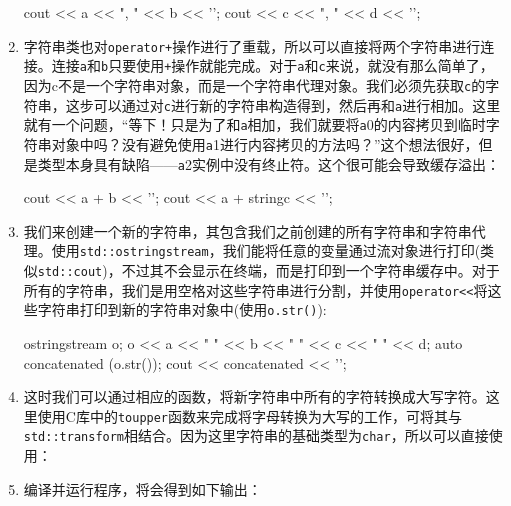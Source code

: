 \begin{enumerate}
\begin{codebox}[cpp]
    cout << a << ", " << b << '\n';
    cout << c << ", " << d << '\n'; 
\end{codebox}

\item 字符串类也对\texttt{operator+}操作进行了重载，所以可以直接将两个字符串进行连接。连接\texttt{a}和\texttt{b}只要使用\texttt{+}操作就能完成。对于\texttt{a}和\texttt{c}来说，就没有那么简单了，因为c不是一个字符串对象，而是一个字符串代理对象。我们必须先获取\texttt{c}的字符串，这步可以通过对\texttt{c}进行新的字符串构造得到，然后再和\texttt{a}进行相加。这里就有一个问题，“等下！只是为了和\texttt{a}相加，我们就要将\texttt{a}0的内容拷贝到临时字符串对象中吗？没有避免使用\texttt{a}1进行内容拷贝的方法吗？”这个想法很好，但是类型本身具有缺陷——\texttt{a}2实例中没有终止符。这个很可能会导致缓存溢出：

\begin{codebox}[cpp]
    cout << a + b << '\n';
    cout << a + string{c} << '\n'; 
\end{codebox}

\item 我们来创建一个新的字符串，其包含我们之前创建的所有字符串和字符串代理。使用\texttt{std::ostringstream}，我们能将任意的变量通过流对象进行打印(类似\texttt{std::cout})，不过其不会显示在终端，而是打印到一个字符串缓存中。对于所有的字符串，我们是用空格对这些字符串进行分割，并使用\texttt{operator<<}将这些字符串打印到新的字符串对象中(使用\texttt{o.str()}):

\begin{codebox}[cpp]
ostringstream o;
o << a << " " << b << " " << c << " " << d;
auto concatenated (o.str());
cout << concatenated << '\n';
\end{codebox}

\item 这时我们可以通过相应的函数，将新字符串中所有的字符转换成大写字符。这里使用C库中的\texttt{toupper}函数来完成将字母转换为大写的工作，可将其与\texttt{std::transform}相结合。因为这里字符串的基础类型为\texttt{char}，所以可以直接使用：

\begin{codebox}[cpp]
    transform(begin(concatenated), end(concatenated),
             begin(concatenated), ::toupper);
    cout << concatenated << '\n';
}
\end{codebox}

\item 编译并运行程序，将会得到如下输出：


\end{enumerate}

